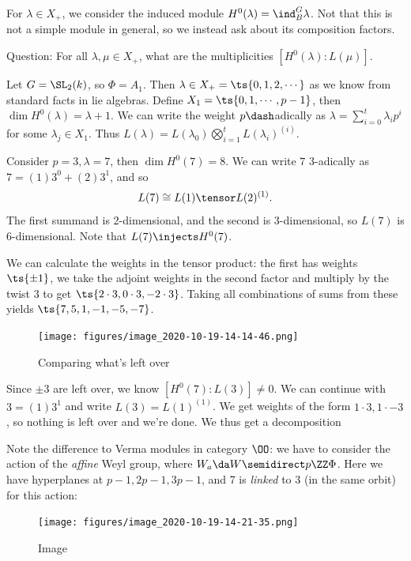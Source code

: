 For \(\lambda \in X_+\), we consider the induced module
\(H^0(\lambda) = \ind_B^G \lambda\). Not that this is not a simple
module in general, so we instead ask about its composition factors.

Question: For all \(\lambda, \mu \in X_+\), what are the multiplicities
\([H^0(\lambda): L(\mu)]\).

\begin{example}

Let \(G = \SL_2(k)\), so \(\Phi = A_1\). Then
\(\lambda \in X_+ = \ts{0,1,2,\cdots}\) as we know from standard facts
in lie algebras. Define \(X_1 = \ts{0, 1, \cdots, p-1}\), then
\(\dim H^0(\lambda) = \lambda + 1\). We can write the weight
\(p\dash\)adically as \(\lambda = \sum_{i=0}^t \lambda_i p^i\) for some
\(\lambda_j\in X_1\). Thus
\(L(\lambda) = L(\lambda_0) \bigotimes_{i=1}^t L(\lambda_i)^{(i)}\).

Consider \(p=3, \lambda = 7\), then \(\dim H^0(7) = 8\). We can write
\(7\) 3-adically as \(7 = (1)3^0 + (2)3^1\), and so
\begin{align*}  
L(7) \cong L(1) \tensor L(2)^{(1)}
.\end{align*} The first summand is 2-dimensional, and the second is
3-dimensional, so \(L(7)\) is 6-dimensional. Note that
\(L(7) \injects H^0(7)\).

We can calculate the weights in the tensor product: the first has
weights \(\ts{\pm 1}\), we take the adjoint weights in the second factor
and multiply by the twist 3 to get
\(\ts{2\cdot 3, 0\cdot 3, -2\cdot 3}\). Taking all combinations of sums
from these yields \(\ts{7,5,1,-1,-5,-7}\).

\begin{figure}
\centering
\texttt{[image: figures/image\_2020-10-19-14-14-46.png]}
\caption{Comparing what's left over}
\end{figure}

Since \(\pm 3\) are left over, we know \([H^0(7): L(3)] \neq 0\). We can
continue with \(3 = (1)3^1\) and write \(L(3) = L(1)^{(1)}\). We get
weights of the form \(1\cdot 3, 1\cdot -3\), so nothing is left over and
we're done. We thus get a decomposition

\begin{center}
\end{center}

Note the difference to Verma modules in category \(\OO\): we have to
consider the action of the \emph{affine} Weyl group, where
\(W_a \da W \semidirect p\ZZ\Phi\). Here we have hyperplanes at
\(p-1, 2p-1, 3p-1\), and 7 is \emph{linked} to 3 (in the same orbit) for
this action:

\begin{figure}
\centering
\texttt{[image: figures/image\_2020-10-19-14-21-35.png]}
\caption{Image}
\end{figure}

\end{example}


